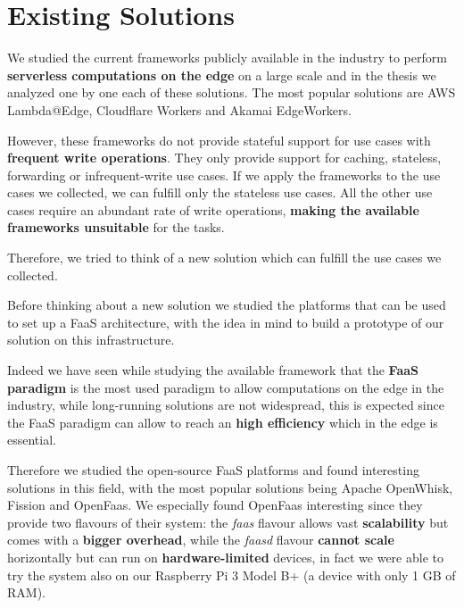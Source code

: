 \section{Existing Solutions}
\label{sec:existing-solutions}

We studied the current frameworks publicly available in the industry to perform \textbf{serverless computations on the edge} on a large scale and in the thesis we analyzed one by one each of these solutions. The most popular solutions are AWS Lambda@Edge, Cloudflare Workers and Akamai EdgeWorkers.

However, these frameworks do not provide stateful support for use cases with \textbf{frequent write operations}. They only provide support for caching, stateless, forwarding or infrequent-write use cases.
If we apply the frameworks to the use cases we collected, we can fulfill only the stateless use cases. All the other use cases require an abundant rate of write operations, \textbf{making the available frameworks unsuitable} for the tasks.

Therefore, we tried to think of a new solution which can fulfill the use cases we collected.

Before thinking about a new solution we studied the platforms that can be used to set up a FaaS architecture, with the idea in mind to build a prototype of our solution on this infrastructure.

Indeed we have seen while studying the available framework that the \textbf{FaaS paradigm} is the most used paradigm to allow computations on the edge in the industry, while long-running solutions are not widespread, this is expected since the FaaS paradigm can allow to reach an \textbf{high efficiency}  \cite{lightweight-virtualization} which in the edge is essential.

Therefore we studied the open-source FaaS platforms and found interesting solutions in this field, with the most popular solutions being Apache OpenWhisk, Fission and OpenFaas. We especially found OpenFaas interesting since they provide two flavours of their system: the \textit{faas} flavour allows vast \textbf{scalability} but comes with a \textbf{bigger overhead}, while the \textit{faasd} flavour \textbf{cannot scale} horizontally but can run on \textbf{hardware-limited} devices, in fact we were able to try the system also on our Raspberry Pi 3 Model B+ (a device with only 1 GB of RAM).
